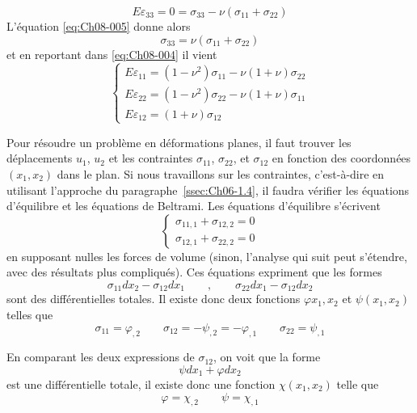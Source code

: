 \begin{equation}
     E\varepsilon_{33} = 0 = \sigma_{33}-\nu(\sigma_{11}+\sigma_{22})
    \label{eq:Ch08-005}
\end{equation}
L'équation \eqref{eq:Ch08-005} donne alors 
\begin{equation}
    \sigma_{33}=\nu(\sigma_{11}+\sigma_{22})
    \label{eq:Ch08-006}
\end{equation}
et en reportant dans \eqref{eq:Ch08-004} il vient 
\begin{equation}
   \begin{cases}
     E\varepsilon_{11} = (1-\nu^2)\sigma_{11} - \nu(1+\nu)\sigma_{22}\\
     E\varepsilon_{22} = (1-\nu^2)\sigma_{22} - \nu(1+\nu)\sigma_{11}\\
     E\varepsilon_{12} = (1+\nu)\sigma_{12}
   \end{cases}
    \label{eq:Ch08-007}
\end{equation}

Pour résoudre un problème en déformations planes, il faut trouver les déplacements $u_1$, $u_2$ et les contraintes $\sigma_{11}$, $\sigma_{22}$, et $\sigma_{12}$ en fonction des coordonnées $(x_1,x_2)$ dans le plan.
Si nous travaillons sur les contraintes, c'est-à-dire en utilisant l'appro­che du paragraphe~\ref{ssec:Ch06-1.4}, il faudra vérifier les équations d'équilibre et les équa­tions de Beltrami. 
Les équations d'équilibre s'écrivent 
\begin{equation}
   \begin{cases}
     \sigma_{11,1}+\sigma_{12,2}=0\\
     \sigma_{12,1}+\sigma_{22,2}=0
   \end{cases}
    \label{eq:Ch08-008}
\end{equation}
en supposant nulles les forces de volume (sinon, l'analyse qui suit peut s'é­tendre, avec des résultats plus compliqués). 
Ces équations expriment que les formes 
\begin{equation*}
\sigma_{11}dx_2-\sigma_{12}dx_1 \qquad,\qquad \sigma_{22}dx_1-\sigma_{12}dx_2
\end{equation*}
sont des différentielles totales. Il existe donc deux fonctions   $\varphi{x_1,x_2}$ et $\psi(x_1,x_2)$ telles que 
\begin{equation*}
\sigma_{11}=\varphi_{,2} \qquad \sigma_{12}=-\psi_{,2}=-\varphi_{,1} \qquad \sigma_{22}=\psi_{,1}
\end{equation*}

En comparant les deux expressions de $\sigma_{12}$, on voit que la forme 
\begin{equation*}
\psi dx_1 + \varphi dx_2
\end{equation*}
est une différentielle totale, il existe donc une fonction $\chi(x_1,x_2)$ telle que 
\begin{equation*}
\varphi=\chi_{,2} \qquad \psi=\chi_{,1}
\end{equation*}

